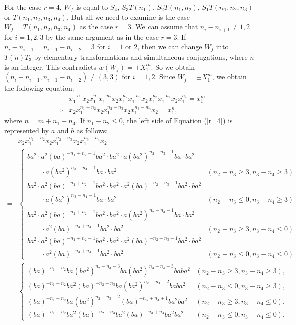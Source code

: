 \documentclass{amsart}
\theoremstyle{plain}
\theoremstyle{definition}
\begin{document}
For the case $r=4$, $W_f$ is equal to $S_4$, $S_3T(n_1)$, $S_2T(n_1,n_2)$, $S_1T(n_1,n_2,n_3)$ or $T(n_1,n_2,n_3,n_4)$. 
But all we need to examine is the case $W_f=T(n_1,n_2,n_3,n_4)$ as the case $r=3$. 
We can assume that $n_i-n_{i+1}\neq 1,2$ for $i=1,2,3$ by the same argument as in the case $r=3$. 
If $n_i-n_{i+1}=n_{i+1}-n_{i+2}=3$ for $i=1$ or $2$, then we can change $W_f$ into $T(\tilde{n})T_3$ by elementary transformations and simultaneous conjugations, where $\tilde{n}$ is an integer. 
This contradicts $w(W_f)=\pm X_1^m$. 
So we obtain $(n_i-n_{i+1},n_{i+1}-n_{i+2})\neq (3,3)$ for $i=1,2$. 
Since $W_f=\pm X_1^m$, we obtain the following equation: 
{\allowdisplaybreaks
\begin{align}
\label{r=4}
& x_1^{-n_1}x_2x_1^{n_1}x_1^{-n_2}x_2x_1^{n_2}x_1^{-n_3}x_2x_1^{n_3}x_1^{-n_4}x_2x_1^{n_4}=x_1^m \nonumber \\
\Rightarrow & x_2x_1^{n_1-n_2}x_2x_1^{n_2-n_3}x_2x_1^{n_3-n_4}x_2=x_1^n, 
\end{align}
}
where $n=m+n_1-n_4$. 
If $n_1-n_2\leq 0$, the left side of Equation (\ref{r=4}) is represented by $a$ and $b$ as follows: 
{\allowdisplaybreaks
\begin{align*}
& x_2x_1^{n_1-n_2}x_2x_1^{n_2-n_3}x_2x_1^{n_3-n_4}x_2 \\
= & \begin{cases}
ba^2\cdot a^2(ba)^{-n_1+n_2-1}ba^2\cdot ba^2\cdot a(ba^2)^{n_2-n_3-1}ba\cdot ba^2 \\
\hspace{2em}\cdot a(ba^2)^{n_3-n_4-1}ba\cdot ba^2 & (n_2-n_3\geq 3, n_3-n_4\geq 3) \\
ba^2\cdot a^2(ba)^{-n_1+n_2-1}ba^2\cdot ba^2\cdot a^2(ba)^{-n_2+n_3-1}ba^2 \cdot ba^2 \\
\hspace{2em}\cdot a(ba^2)^{n_3-n_4-1}ba\cdot ba^2 & (n_2-n_3\leq 0, n_3-n_4\geq 3) \\
ba^2\cdot a^2(ba)^{-n_1+n_2-1}ba^2\cdot ba^2\cdot a(ba^2)^{n_2-n_3-1}ba\cdot ba^2 \\
\hspace{2em}\cdot a^2(ba)^{-n_3+n_4-1}ba^2\cdot ba^2 & (n_2-n_3\geq 3, n_3-n_4\leq 0) \\
ba^2\cdot a^2(ba)^{-n_1+n_2-1}ba^2\cdot ba^2\cdot a^2(ba)^{-n_2+n_3-1}ba^2\cdot ba^2 \\
\hspace{2em}\cdot a^2(ba)^{-n_3+n_4-1}ba^2\cdot ba^2 & (n_2-n_3\leq 0, n_3-n_4\leq 0)
\end{cases} \\
= & \begin{cases}
(ba)^{-n_1+n_2}ba(ba^2)^{n_2-n_3-3}ba(ba^2)^{n_3-n_4-3}baba^2 & (n_2-n_3\geq 3, n_3-n_4\geq 3), \\
(ba)^{-n_1+n_2}ba^2(ba)^{-n_2+n_3}ba(ba^2)^{n_3-n_4-2}baba^2 & (n_2-n_3\leq 0, n_3-n_4\geq 3), \\
(ba)^{-n_1+n_2}ba(ba^2)^{n_2-n_3-2}(ba)^{-n_3+n_4+1}ba^2ba^2 & (n_2-n_3\geq 3, n_3-n_4\leq 0), \\
(ba)^{-n_1+n_2}ba^2(ba)^{-n_2+n_3}ba^2(ba)^{-n_3+n_4}ba^2ba^2 & (n_2-n_3\leq 0, n_3-n_4\leq 0).
\end{cases} 
\end{align*}
}
\end{document}
